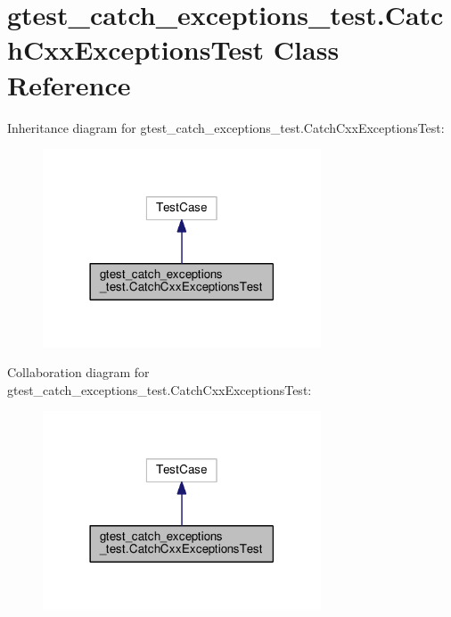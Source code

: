 \hypertarget{classgtest__catch__exceptions__test_1_1CatchCxxExceptionsTest}{}\section{gtest\+\_\+catch\+\_\+exceptions\+\_\+test.\+Catch\+Cxx\+Exceptions\+Test Class Reference}
\label{classgtest__catch__exceptions__test_1_1CatchCxxExceptionsTest}


Inheritance diagram for gtest\+\_\+catch\+\_\+exceptions\+\_\+test.\+Catch\+Cxx\+Exceptions\+Test\+:\nopagebreak
\begin{figure}[H]
\begin{center}
\leavevmode
\includegraphics[width=234pt]{classgtest__catch__exceptions__test_1_1CatchCxxExceptionsTest__inherit__graph}
\end{center}
\end{figure}


Collaboration diagram for gtest\+\_\+catch\+\_\+exceptions\+\_\+test.\+Catch\+Cxx\+Exceptions\+Test\+:\nopagebreak
\begin{figure}[H]
\begin{center}
\leavevmode
\includegraphics[width=234pt]{classgtest__catch__exceptions__test_1_1CatchCxxExceptionsTest__coll__graph}
\end{center}
\end{figure}
